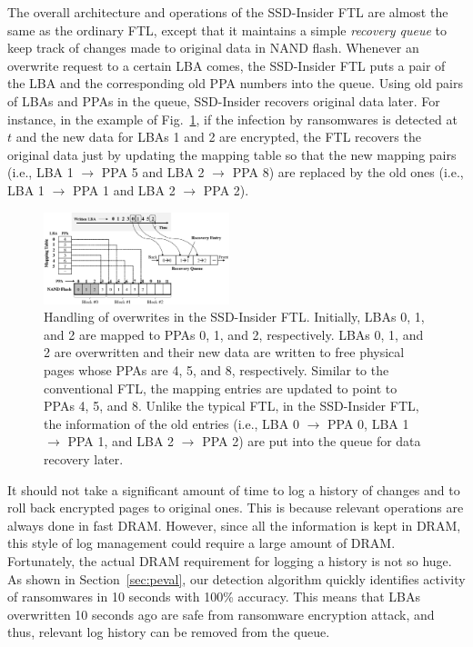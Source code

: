 \documentclass[conference]{IEEEtran}
\newcommand{\ours}{SSD-Insider}
\begin{document}
The overall architecture and operations of the \ours{} FTL are almost the same
as the ordinary FTL, except that it maintains a simple \textit{recovery queue}
to keep track of changes made to original data in NAND flash.  Whenever an
overwrite request to a certain LBA comes, the \ours{} FTL puts a pair of the
LBA and the corresponding old PPA numbers into the queue.  Using old pairs of
LBAs and PPAs in the queue, \ours{} recovers original data later.  For
instance, in the example of Fig.~\ref{fig:io-handling}, if the infection by
ransomwares is detected at $t$ and the new data for LBAs 1 and 2 are encrypted,
the FTL recovers the original data just by updating the mapping table so that
the new mapping pairs (i.e., LBA 1 $\rightarrow$ PPA 5 and LBA 2 $\rightarrow$
PPA 8) are replaced by the old ones (i.e., LBA 1 $\rightarrow$ PPA 1 and LBA 2
$\rightarrow$ PPA 2).


\begin{figure}
\centering
\includegraphics[width=0.48\textwidth]{fig/flash-fig2}
\caption{
Handling of overwrites in the \ours{} FTL.  Initially, LBAs 0, 1, and 2 are
mapped to PPAs 0, 1, and 2, respectively.  LBAs 0, 1, and 2 are overwritten and
their new data are written to free physical pages whose PPAs are 4, 5, and 8,
respectively. Similar to the conventional FTL, the mapping entries are updated
to point to PPAs 4, 5, and 8.  Unlike the typical FTL, in the \ours{} FTL, the information
of the old entries (i.e., LBA 0 $\rightarrow$ PPA 0, LBA 1 $\rightarrow$ PPA 1, and LBA 2
$\rightarrow$ PPA 2) are put into the queue for data recovery later.
}
\label{fig:io-handling}
\end{figure}

It should not take a significant amount of time to log a history of
changes and to roll back encrypted pages to original ones. This is
because relevant operations are always done in fast DRAM.  However,
since all the information is kept in DRAM, this style of log
management could require a large amount of DRAM.  Fortunately, the
actual DRAM requirement for logging a history is not so huge.  As
shown in Section~\ref{sec:peval}, our detection algorithm
quickly identifies activity of ransomwares in 10 seconds with
100\% accuracy. This means that LBAs overwritten 10 seconds ago
are safe from ransomware encryption attack, and thus, relevant log
history can be removed from the queue. 
\end{document}
